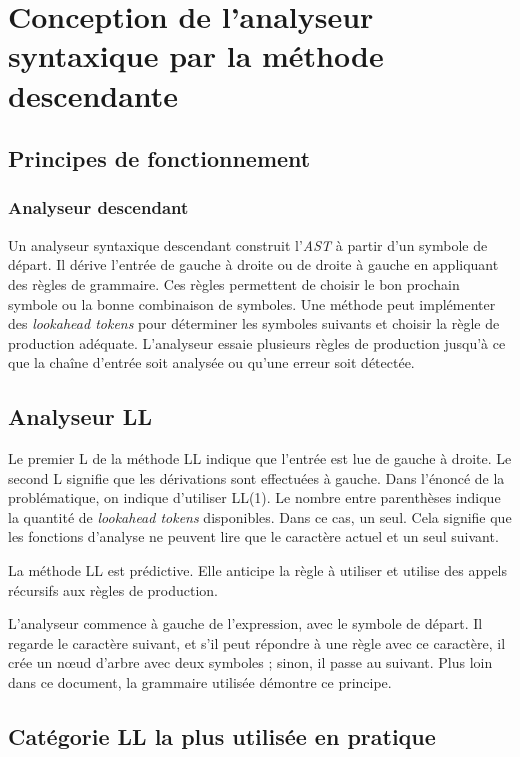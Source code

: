 \section{Conception de l'analyseur syntaxique par la méthode descendante}

\subsection{Principes de fonctionnement}

\subsubsection{Analyseur descendant}

Un analyseur syntaxique descendant construit l'\textit{AST} à partir d'un
symbole de départ. Il dérive l'entrée de gauche à droite ou de droite à
gauche en appliquant des règles de grammaire. Ces règles permettent de choisir
le bon prochain symbole ou la bonne combinaison de symboles. Une méthode peut
implémenter des \textit{lookahead tokens} pour déterminer les symboles
suivants et choisir la règle de production adéquate. L'analyseur essaie
plusieurs règles de production jusqu'à ce que la chaîne d'entrée soit analysée
ou qu'une erreur soit détectée.

\subsection{Analyseur LL}

Le premier L de la méthode LL indique que l'entrée est lue de gauche à droite.
Le second L signifie que les dérivations sont effectuées à gauche. Dans
l'énoncé de la problématique, on indique d'utiliser LL(1). Le nombre entre
parenthèses indique la quantité de \textit{lookahead tokens} disponibles.
Dans ce cas, un seul. Cela signifie que les fonctions d'analyse ne peuvent lire
que le caractère actuel et un seul suivant.

La méthode LL est prédictive. Elle anticipe la règle à utiliser et utilise des
appels récursifs aux règles de production.

L'analyseur commence à gauche de l'expression, avec le symbole de départ. Il
regarde le caractère suivant, et s’il peut répondre à une règle avec ce
caractère, il crée un nœud d'arbre avec deux symboles ; sinon, il passe au
suivant. Plus loin dans ce document, la grammaire utilisée démontre ce
principe.

\subsection{Catégorie LL la plus utilisée en pratique}

